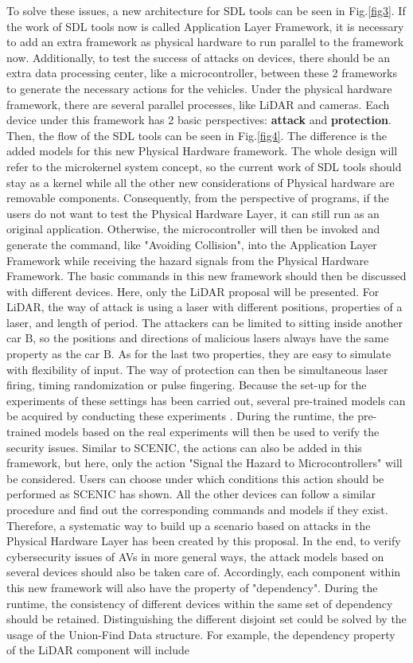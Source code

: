 \documentclass[conference]{IEEEtran}
\begin{document}
To solve these issues, a new architecture for SDL tools can be seen in Fig.\ref{fig3}. If the work of SDL tools now is called Application Layer Framework, it is necessary to add an extra framework as physical hardware to run parallel to the framework now. Additionally, to test the success of attacks on devices, there should be an extra data processing center, like a microcontroller, between these 2 frameworks to generate the necessary actions for the vehicles. Under the physical hardware framework, there are several parallel processes, like LiDAR and cameras. Each device under this framework has 2 basic perspectives: \textbf{attack} and \textbf{protection}. Then, the flow of the SDL tools can be seen in Fig.\ref{fig4}. The difference is the added models for this new Physical Hardware framework. The whole design will refer to the microkernel system concept, so the current work of SDL tools should stay as a kernel while all the other new considerations of Physical hardware are removable components. Consequently, from the perspective of programs, if the users do not want to test the Physical Hardware Layer, it can still run as an original application. Otherwise, the microcontroller will then be invoked and generate the command, like "Avoiding Collision", into the Application Layer Framework while receiving the hazard signals from the Physical Hardware Framework. The basic commands in this new framework should then be discussed with different devices. Here, only the LiDAR proposal will be presented. For LiDAR, the way of attack is using a laser with different positions, properties of a laser, and length of period. The attackers can be limited to sitting inside another car  $\mathrm {B}$, so the positions and directions of malicious lasers always have the same property as the car $\mathrm {B}$. As for the last two properties, they are easy to simulate with flexibility of input. The way of protection can then be simultaneous laser firing, timing randomization or pulse fingering. Because the set-up for the experiments of these settings has been carried out, several pre-trained models can be acquired by conducting these experiments \cite{b2}. During the runtime, the pre-trained models based on the real experiments will then be used to verify the security issues. Similar to SCENIC, the actions can also be added in this framework, but here, only the action "Signal the Hazard to Microcontrollers" will be considered. Users can choose under which conditions this action should be performed as SCENIC has shown. All the other devices can follow a similar procedure and find out the corresponding commands and models if they exist. Therefore, a systematic way to build up a scenario based on attacks in the Physical Hardware Layer has been created by this proposal. In the end, to verify cybersecurity issues of AVs in more general ways, the attack models based on several devices should also be taken care of. Accordingly, each component within this new framework will also have the property of "dependency". During the runtime, the consistency of different devices within the same set of dependency should be retained. Distinguishing the different disjoint set could be solved by the usage of the Union-Find Data structure. For example, the dependency property of the LiDAR component will include 
\end{document}
